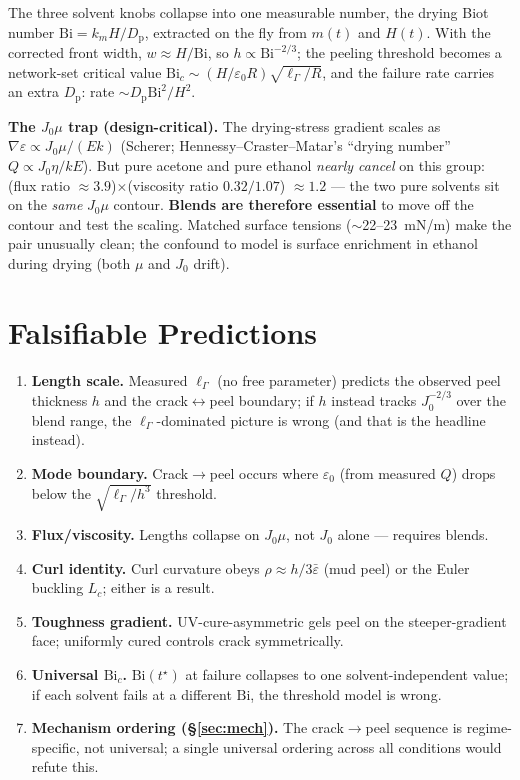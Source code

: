 \documentclass[12pt,letterpaper]{article}
\newcommand{\Gfrac}{\Gamma}
\newcommand{\Emod}{E}
\newcommand{\lG}{\ell_{\Gfrac}}          %
\newcommand{\Dp}{D_{\mathrm{p}}}
\newcommand{\Jflux}{J_0}
\newcommand{\nve}{\nabla\varepsilon}
\newcommand{\Bic}{\mathrm{Bi}_c}
\newcommand{\Bi}{\mathrm{Bi}}
\begin{document}
\noindent The three solvent knobs collapse into one measurable number, the
drying Biot number $\Bi=k_mH/\Dp$, extracted on the fly from $m(t)$ and $H(t)$.
With the corrected front width, $w\approx H/\Bi$, so
$h\propto\Bi^{-2/3}$; the peeling threshold becomes a network-set critical value
$\Bic\sim (H/\varepsilon_0 R)\sqrt{\lG/R}$, and the failure rate carries an extra
$\Dp$: rate $\sim \Dp\Bi^2/H^2$.

\begin{cautionbox}
\textbf{The $\Jflux\mu$ trap (design-critical).} The drying-stress gradient scales
as $\nve\propto \Jflux\mu/(\Emod k)$ (Scherer; Hennessy--Craster--Matar's
``drying number'' $Q\propto \Jflux\eta/kE$). But pure acetone and pure ethanol
\emph{nearly cancel} on this group: (flux ratio $\approx3.9$)$\times$(viscosity
ratio $0.32/1.07$) $\approx 1.2$ --- the two pure solvents sit on the \emph{same}
$\Jflux\mu$ contour. \textbf{Blends are therefore essential} to move off the
contour and test the scaling. Matched surface tensions ($\sim$22--23~mN/m) make
the pair unusually clean; the confound to model is surface enrichment in ethanol
during drying (both $\mu$ and $\Jflux$ drift).
\end{cautionbox}

\section{Falsifiable Predictions}
\begin{enumerate}[label=\textbf{P\arabic*.},leftmargin=2.4em,itemsep=1pt]
\item \textbf{Length scale.} Measured $\lG$ (no free parameter) predicts the
observed peel thickness $h$ and the crack$\leftrightarrow$peel boundary; if $h$
instead tracks $\Jflux^{-2/3}$ over the blend range, the $\lG$-dominated picture
is wrong (and that is the headline instead).
\item \textbf{Mode boundary.} Crack$\to$peel occurs where $\varepsilon_0$ (from
measured $Q$) drops below the $\sqrt{\lG/h^3}$ threshold.
\item \textbf{Flux/viscosity.} Lengths collapse on $\Jflux\mu$, not $\Jflux$
alone --- requires blends.
\item \textbf{Curl identity.} Curl curvature obeys $\rho\approx h/3\bar\varepsilon$
(mud peel) or the Euler buckling $L_c$; either is a result.
\item \textbf{Toughness gradient.} UV-cure-asymmetric gels peel on the
steeper-gradient face; uniformly cured controls crack symmetrically.
\item \textbf{Universal $\Bic$.} $\Bi(t^\star)$ at failure collapses to one
solvent-independent value; if each solvent fails at a different $\Bi$, the
threshold model is wrong.
\item \textbf{Mechanism ordering (\S\ref{sec:mech}).} The crack$\to$peel sequence
is regime-specific, not universal; a single universal ordering across all
conditions would refute this.
\end{enumerate}
\end{document}
